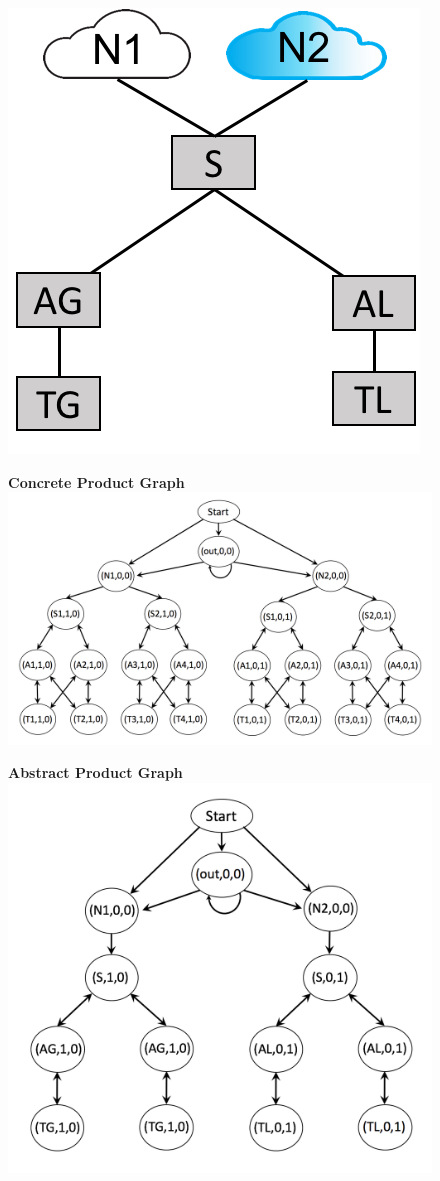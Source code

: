 \documentclass[numbers, 10pt, preprint]{sigplanconf}
\newcommand{\hdr}[2]{\flushleft \chdr{\hspace{5mm}#1}{#2}}
\newcommand{\chdr}[2]{\textbf{#1} {#2} \\ \centering}%
\begin{document}
\begin{figure}[t!]
\begin{minipage}[t]{.3\linewidth}
    \includegraphics[width=.57\columnwidth]{figures/topology-abs}
  \end{minipage}%

  \vspace{1em}
  \begin{minipage}[t]{.6\linewidth}
    \hdr{Concrete Product Graph}{}
    \includegraphics[width=.9\columnwidth]{figures/pg-con}
  \end{minipage}%
  \begin{minipage}[t]{.4\linewidth}
  \hdr{Abstract Product Graph}{}
    \includegraphics[width=.88\columnwidth]{figures/pg-abs}


\end{minipage}
\end{figure}
\end{document}
